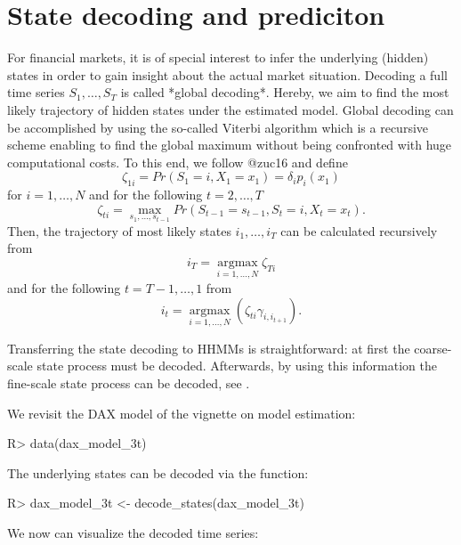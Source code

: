 \documentclass[article]{jss}
\newcommand{\fct}[1]{\code{#1()}}
\begin{document}
\section{State decoding and prediciton} \label{sec:state_decoding_and_prediction} %

For financial markets, it is of special interest to infer the underlying (hidden) states in order to gain insight about the actual market situation. Decoding a full time series $S_1, \ldots, S_T$ is called *global decoding*. Hereby, we aim to find the most likely trajectory of hidden states under the estimated model. 
Global decoding can be accomplished by using the so-called Viterbi algorithm which is a recursive scheme enabling to find the global maximum without being confronted with huge computational costs. To this end, we follow @zuc16 and define
$$\zeta_{1i} = Pr(S_1 = i, X_1 = x_1) = \delta_i p_i(x_1)$$ 
for $i = 1, \ldots, N$ and for the following $t = 2, \ldots, T$
$$\zeta_{ti} = \operatorname*{max}_{s_1, \ldots, s_{t-1}} Pr(S_{t-1} = s_{t-1}, S_t = i, X_t = x_t).$$ 
Then, the trajectory of most likely states $i_1, \ldots, i_T$ can be calculated recursively from
$$i_T = \operatorname*{argmax}_{i = 1, \ldots, N} \zeta_{Ti}$$ and for the following $t = T-1, \ldots, 1$ from
$$i_t = \operatorname*{argmax}_{i = 1, \ldots, N} (\zeta_{ti} \gamma_{i, i_{t+1}}).$$

Transferring the state decoding to HHMMs is straightforward: at first the coarse-scale state process must be decoded. Afterwards, by using this information the fine-scale state process can be decoded, see \cite{ada19}.

We revisit the DAX model of the vignette on model estimation:

%
\begin{Schunk}
\begin{Sinput}
R> data(dax_model_3t)
\end{Sinput}
\end{Schunk}
%

The underlying states can be decoded via the \fct{decode\_states} function:

%
\begin{Schunk}
\begin{Sinput}
R> dax_model_3t <- decode_states(dax_model_3t)
\end{Sinput}
\end{Schunk}
%

We now can visualize the decoded time series:
\end{document}
